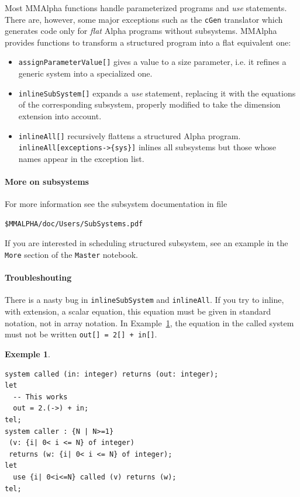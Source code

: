 \documentclass[12pt]{article}
\newcommand{\Alpha}{{\sc Alpha}}
\newcommand{\MMA}{{\sc MMAlpha}}
\newcommand{\alfa}{\Alpha}
\newcommand{\mmalfa}{\MMA}
\newtheorem{ex}{Exemple}[section]
\begin{document}
Most \mmalfa{} functions handle parameterized programs and \emph{use}
statements. There are, however, some major exceptions such as the
\texttt{cGen} translator which generates code
only for {\em flat} {\Alpha} programs without subsystems. 
\mmalfa{}
provides functions to transform a structured program
into a flat equivalent one:
\begin{itemize}
\item \texttt{assignParameterValue[]}
gives a value to a size parameter, i.e. it refines a generic system
into a specialized one.
\item \texttt{inlineSubSystem[]}
expands a
\emph{use} statement, replacing it with the equations of the
corresponding subsystem, properly modified to take the dimension
extension into account.
\item \texttt{inlineAll[]}
recursively flattens a
structured {\alfa} program. \texttt{inlineAll[exceptions->\{sys\}]}
inlines all subsystems but those whose names appear in the 
exception list.
\end{itemize}

\paragraph*{More on subsystems}
For more information see 
{the subsystem documentation} in file
\begin{verbatim}
$MMALPHA/doc/Users/SubSystems.pdf
\end{verbatim}
If you are interested in scheduling structured subsystem, 
see an example in the \texttt{More} section of the 
\texttt{Master} notebook. 

\paragraph*{Troubleshouting}
There is a nasty bug in \texttt{inlineSubSystem} and
\texttt{inlineAll}. If you try to inline, with extension, 
a scalar equation, this equation must be given in 
standard notation, not in array notation. In Example~\ref{bug},
the equation in the called system must not be
written \texttt{out[] = 2[] + in[]}.
\begin{ex}{~}
\begin{verbatim}
system called (in: integer) returns (out: integer);
let
  -- This works
  out = 2.(->) + in;
tel;
system caller : {N | N>=1}
 (v: {i| 0< i <= N} of integer) 
 returns (w: {i| 0< i <= N} of integer);
let
  use {i| 0<i<=N} called (v) returns (w);
tel;
\end{verbatim}
\label{bug}
\end{ex}
\end{document}
